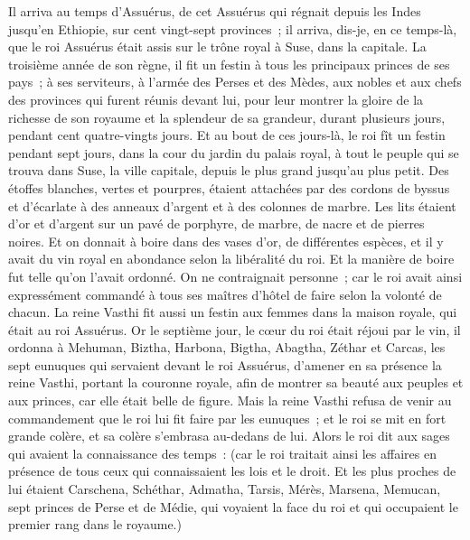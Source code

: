 \begin{multicols}{2}
\VerseOne{}Il arriva au temps d'Assuérus, de cet Assuérus qui régnait depuis les Indes jusqu'en Ethiopie, sur cent vingt-sept provinces~;
il arriva, dis-je, en ce temps-là, que le roi Assuérus était assis sur le trône royal à Suse, dans la capitale.
La troisième année de son règne, il fit un festin à tous les principaux princes de ses pays~; à ses serviteurs, à l'armée des Perses et des Mèdes, aux nobles et aux chefs des provinces qui furent réunis devant lui,
pour leur montrer la gloire de la richesse de son royaume et la splendeur de sa grandeur, durant plusieurs jours, pendant cent quatre-vingts jours.
Et au bout de ces jours-là, le roi fît un festin pendant sept jours, dans la cour du jardin du palais royal, à tout le peuple qui se trouva dans Suse, la ville capitale, depuis le plus grand jusqu'au plus petit.
Des étoffes blanches, vertes et pourpres, étaient attachées par des cordons de byssus et d'écarlate à des anneaux d'argent et à des colonnes de marbre. Les lits étaient d'or et d'argent sur un pavé de porphyre, de marbre, de nacre et de pierres noires.
Et on donnait à boire dans des vases d'or, de différentes espèces, et il y avait du vin royal en abondance selon la libéralité du roi.
Et la manière de boire fut telle qu'on l'avait ordonné. On ne contraignait personne~; car le roi avait ainsi expressément commandé à tous ses maîtres d'hôtel de faire selon la volonté de chacun.
La reine Vasthi fit aussi un festin aux femmes dans la maison royale, qui était au roi Assuérus.
Or le septième jour, le cœur du roi était réjoui par le vin, il ordonna à Mehuman, Biztha, Harbona, Bigtha, Abagtha, Zéthar et Carcas, les sept eunuques qui servaient devant le roi Assuérus,
d'amener en sa présence la reine Vasthi, portant la couronne royale, afin de montrer sa beauté aux peuples et aux princes, car elle était belle de figure.
Mais la reine Vasthi refusa de venir au commandement que le roi lui fit faire par les eunuques~; et le roi se mit en fort grande colère, et sa colère s'embrasa au-dedans de lui.
Alors le roi dit aux sages qui avaient la connaissance des temps~: (car le roi traitait ainsi les affaires en présence de tous ceux qui connaissaient les lois et le droit.
Et les plus proches de lui étaient Carschena, Schéthar, Admatha, Tarsis, Mérès, Marsena, Memucan, sept princes de Perse et de Médie, qui voyaient la face du roi et qui occupaient le premier rang dans le royaume.)

\end{multicols}
